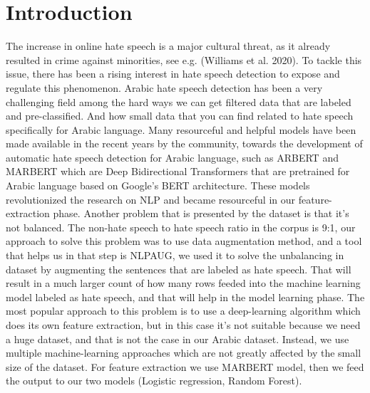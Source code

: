 \documentclass{IEEEtran}
\begin{document}
\section{Introduction}
The increase in online hate speech is a major cultural threat, as it already resulted in crime against minorities, see e.g. (Williams et al. 2020). To tackle this issue, there has been a rising interest in hate speech detection to expose and regulate this phenomenon. Arabic hate speech detection has been a very challenging field among the hard ways we can get filtered data that are labeled and pre-classified. And how small data that you can find related to hate speech specifically for Arabic language.
Many resourceful and helpful models have been made available in the recent years by the community, towards the development of automatic hate speech detection for Arabic language, such as ARBERT and MARBERT which are Deep Bidirectional Transformers that are pretrained for Arabic language based on Google's BERT architecture. These models revolutionized the research on NLP and became resourceful in our feature-extraction phase. 
Another problem that is presented by the dataset is that it’s not balanced. The non-hate speech to hate speech ratio in the corpus is 9:1, our approach to solve this problem was to use data augmentation method, and a tool that helps us in that step is NLPAUG, we used it to solve the unbalancing in dataset by augmenting the sentences that are labeled as hate speech. That will result in a much larger count of how many rows feeded into the machine learning model labeled as hate speech, and that will help in the model learning phase.
The most popular approach to this problem is to use a deep-learning algorithm which does its own feature extraction, but in this case it’s not suitable because we need a huge dataset, and that is not the case in our Arabic dataset. Instead, we use multiple machine-learning approaches which are not greatly affected by the small size of the dataset. For feature extraction we use MARBERT model, then we feed the output to our two models (Logistic regression, Random Forest).
\end{document}
